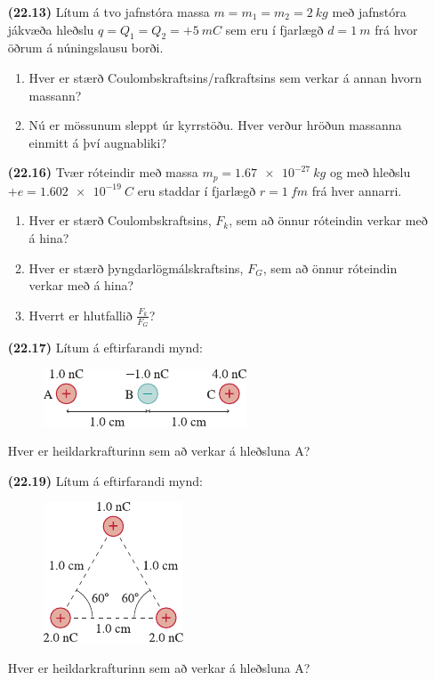\ifdefined \wholebook \else\documentclass[oneside]{book}\usepackage{EdlBook}\graphicspath{{figures/}}
\begin{document}
\begin{enumerate}[label = \textbf{(\alph*)}]
    \item[\textbf{(22.13)}] Lítum á tvo jafnstóra massa $m = m_1 = m_2 = \SI{2}{kg}$ með jafnstóra jákvæða hleðslu $q = Q_1 = Q_2 = +\SI{5}{mC}$ sem eru í fjarlægð $d = \SI{1}{m}$ frá hvor öðrum á núningslausu borði.
    \begin{enumerate}[label = \textbf{(\alph*)}]
        \item Hver er stærð Coulombskraftsins/rafkraftsins sem verkar á annan hvorn massann?
        \item Nú er mössunum sleppt úr kyrrstöðu. Hver verður hröðun massanna einmitt á því augnabliki?
    \end{enumerate}
    
    \item[\textbf{(22.16)}] Tvær róteindir með massa $m_p = \SI{1.67e-27}{kg}$ og með hleðslu $+e = \SI{+1.602e-19}{C}$ eru staddar í fjarlægð $r = \SI{1}{fm}$ frá hver annarri.
    \begin{enumerate}[label = \textbf{(\alph*)}]
        \item Hver er stærð Coulombskraftsins, $F_k$, sem að önnur róteindin verkar með á hina?
        \item Hver er stærð þyngdarlögmálskraftsins, $F_G$, sem að önnur róteindin verkar með á hina?
        \item Hverrt er hlutfallið $\frac{F_k}{F_G}$?
    \end{enumerate}
    
    \item[\textbf{(22.17)}] Lítum á eftirfarandi mynd:
    \begin{figure}[H]
        \centering
        \includegraphics[scale = 1.25]{figures/rk-charges.pdf}
    \end{figure}
    Hver er heildarkrafturinn sem að verkar á hleðsluna A?
    
    \item[\textbf{(22.19)}] Lítum á eftirfarandi mynd:
    \begin{figure}[H]
        \centering
        \includegraphics[scale = 1.25]{figures/rk2219.pdf}
    \end{figure}
    Hver er heildarkrafturinn sem að verkar á hleðsluna A?
\end{enumerate}
\end{document}
